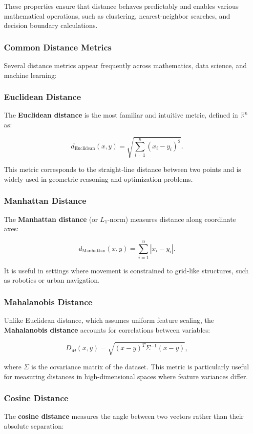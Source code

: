 \documentclass[12pt]{article}
\begin{document}
These properties ensure that distance behaves predictably and enables various mathematical operations, such as clustering, nearest-neighbor searches, and decision boundary calculations.

\subsubsection{Common Distance Metrics}

Several distance metrics appear frequently across mathematics, data science, and machine learning:

\subsubsection{Euclidean Distance}
The \textbf{Euclidean distance} is the most familiar and intuitive metric, defined in \( \mathbb{R}^n \) as:

\[
d_{\text{Euclidean}}(x, y) = \sqrt{\sum_{i=1}^{n} (x_i - y_i)^2}.
\]

This metric corresponds to the straight-line distance between two points and is widely used in geometric reasoning and optimization problems.

\subsubsection{Manhattan Distance}
The \textbf{Manhattan distance} (or \( L_1 \)-norm) measures distance along coordinate axes:

\[
d_{\text{Manhattan}}(x, y) = \sum_{i=1}^{n} |x_i - y_i|.
\]

It is useful in settings where movement is constrained to grid-like structures, such as robotics or urban navigation.

\subsubsection{Mahalanobis Distance}
Unlike Euclidean distance, which assumes uniform feature scaling, the \textbf{Mahalanobis distance} accounts for correlations between variables:

\[
D_M(x, y) = \sqrt{(x - y)^T \Sigma^{-1} (x - y)},
\]

where \( \Sigma \) is the covariance matrix of the dataset. This metric is particularly useful for measuring distances in high-dimensional spaces where feature variances differ.

\subsubsection{Cosine Distance}
The \textbf{cosine distance} measures the angle between two vectors rather than their absolute separation:
\end{document}
